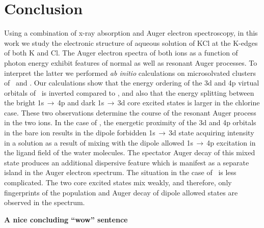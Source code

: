\section{Conclusion}\label{sec:concl}

Using a combination of x-ray absorption and Auger electron spectroscopy, in this work we study the electronic structure of aqueous solution of KCl at the K-edges of both K and Cl. 
The Auger electron spectra of both ions as a function of photon energy exhibit features of normal as well as resonant Auger processes. To interpret the latter we performed {\it ab initio} calculations on microsolvated clusters of \ki~and \cli. Our calculations show that the energy ordering of the 3d and 4p virtual orbitals of \cli~is inverted compared to \ki, and also that the energy splitting between the bright 1s$\,\rightarrow\,$4p and dark 1s$\,\rightarrow\,$3d core excited states is larger in the chlorine case. These two observations determine the course of the resonant Auger process in the two ions. In the case of \ki, the energetic proximity of the 3d and 4p orbitals in the bare ion results in the dipole forbidden 1s$\,\rightarrow\,$3d state acquiring intensity in a solution as a result of mixing with the dipole allowed 1s$\,\rightarrow\,$4p excitation in the ligand field of the water molecules. The spectator Auger decay of this mixed state produces an additional dispersive feature which is manifest as a separate island in the Auger electron spectrum. The situation in the case of \cli~is less complicated. The two core excited states mix weakly, and therefore, only fingerprints of the population and Auger decay of dipole allowed states are observed in the spectrum.

{\bf\color{red}A nice concluding ``wow'' sentence}
